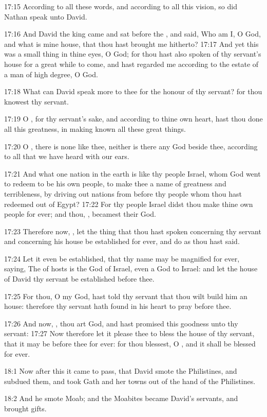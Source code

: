 17:15 According to all these words, and according to all this vision,
so did Nathan speak unto David.

17:16 And David the king came and sat before the \LORD, and said, Who
am I, O \LORD God, and what is mine house, that thou hast brought me
hitherto?  17:17 And yet this was a small thing in thine eyes, O God;
for thou hast also spoken of thy servant's house for a great while to
come, and hast regarded me according to the estate of a man of high
degree, O \LORD God.

17:18 What can David speak more to thee for the honour of thy servant?
for thou knowest thy servant.

17:19 O \LORD, for thy servant's sake, and according to thine own
heart, hast thou done all this greatness, in making known all these
great things.

17:20 O \LORD, there is none like thee, neither is there any God beside
thee, according to all that we have heard with our ears.

17:21 And what one nation in the earth is like thy people Israel, whom
God went to redeem to be his own people, to make thee a name of
greatness and terribleness, by driving out nations from before thy
people whom thou hast redeemed out of Egypt?  17:22 For thy people
Israel didst thou make thine own people for ever; and thou, \LORD,
becamest their God.

17:23 Therefore now, \LORD, let the thing that thou hast spoken
concerning thy servant and concerning his house be established for
ever, and do as thou hast said.

17:24 Let it even be established, that thy name may be magnified for
ever, saying, The \LORD of hosts is the God of Israel, even a God to
Israel: and let the house of David thy servant be established before
thee.

17:25 For thou, O my God, hast told thy servant that thou wilt build
him an house: therefore thy servant hath found in his heart to pray
before thee.

17:26 And now, \LORD, thou art God, and hast promised this goodness
unto thy servant: 17:27 Now therefore let it please thee to bless the
house of thy servant, that it may be before thee for ever: for thou
blessest, O \LORD, and it shall be blessed for ever.

18:1 Now after this it came to pass, that David smote the Philistines,
and subdued them, and took Gath and her towns out of the hand of the
Philistines.

18:2 And he smote Moab; and the Moabites became David's servants, and
brought gifts.

